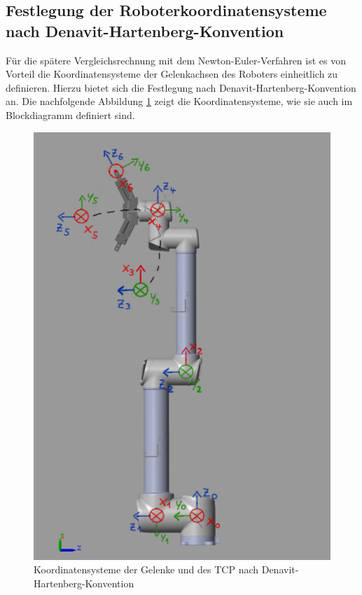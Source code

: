 \newpage

\subsection{Festlegung der Roboterkoordinatensysteme nach Denavit-Hartenberg-Konvention}

Für die spätere Vergleichsrechnung mit dem Newton-Euler-Verfahren ist es von Vorteil die Koordinatensysteme der Gelenkachsen des Roboters einheitlich zu definieren. %
Hierzu bietet sich die Festlegung nach Denavit-Hartenberg-Konvention an.
Die nachfolgende Abbildung \ref{fig:ur10_dh} zeigt die Koordinatensysteme, wie sie auch im Blockdiagramm definiert sind.

\begin{figure}[!htbp]
	\centering
	\includegraphics[width=0.5\linewidth]{grafic/UR10_dh}
	\caption{Koordinatensysteme der Gelenke und des TCP nach Denavit-Hartenberg-Konvention}
	\label{fig:ur10_dh}
\end{figure}



